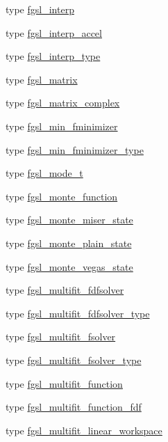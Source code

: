 \begin{DoxyCompactItemize}
\item 
type \hyperlink{structfgsl_1_1fgsl__interp}{fgsl\-\_\-interp}
\item 
type \hyperlink{structfgsl_1_1fgsl__interp__accel}{fgsl\-\_\-interp\-\_\-accel}
\item 
type \hyperlink{structfgsl_1_1fgsl__interp__type}{fgsl\-\_\-interp\-\_\-type}
\item 
type \hyperlink{structfgsl_1_1fgsl__matrix}{fgsl\-\_\-matrix}
\item 
type \hyperlink{structfgsl_1_1fgsl__matrix__complex}{fgsl\-\_\-matrix\-\_\-complex}
\item 
type \hyperlink{structfgsl_1_1fgsl__min__fminimizer}{fgsl\-\_\-min\-\_\-fminimizer}
\item 
type \hyperlink{structfgsl_1_1fgsl__min__fminimizer__type}{fgsl\-\_\-min\-\_\-fminimizer\-\_\-type}
\item 
type \hyperlink{structfgsl_1_1fgsl__mode__t}{fgsl\-\_\-mode\-\_\-t}
\item 
type \hyperlink{structfgsl_1_1fgsl__monte__function}{fgsl\-\_\-monte\-\_\-function}
\item 
type \hyperlink{structfgsl_1_1fgsl__monte__miser__state}{fgsl\-\_\-monte\-\_\-miser\-\_\-state}
\item 
type \hyperlink{structfgsl_1_1fgsl__monte__plain__state}{fgsl\-\_\-monte\-\_\-plain\-\_\-state}
\item 
type \hyperlink{structfgsl_1_1fgsl__monte__vegas__state}{fgsl\-\_\-monte\-\_\-vegas\-\_\-state}
\item 
type \hyperlink{structfgsl_1_1fgsl__multifit__fdfsolver}{fgsl\-\_\-multifit\-\_\-fdfsolver}
\item 
type \hyperlink{structfgsl_1_1fgsl__multifit__fdfsolver__type}{fgsl\-\_\-multifit\-\_\-fdfsolver\-\_\-type}
\item 
type \hyperlink{structfgsl_1_1fgsl__multifit__fsolver}{fgsl\-\_\-multifit\-\_\-fsolver}
\item 
type \hyperlink{structfgsl_1_1fgsl__multifit__fsolver__type}{fgsl\-\_\-multifit\-\_\-fsolver\-\_\-type}
\item 
type \hyperlink{structfgsl_1_1fgsl__multifit__function}{fgsl\-\_\-multifit\-\_\-function}
\item 
type \hyperlink{structfgsl_1_1fgsl__multifit__function__fdf}{fgsl\-\_\-multifit\-\_\-function\-\_\-fdf}
\item 
type \hyperlink{structfgsl_1_1fgsl__multifit__linear__workspace}{fgsl\-\_\-multifit\-\_\-linear\-\_\-workspace}
\item 

\end{DoxyCompactItemize}
